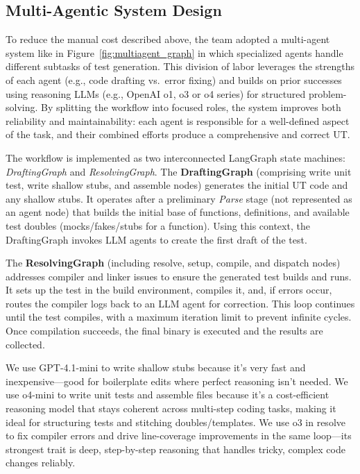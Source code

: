 \documentclass[conference]{IEEEtran}
\begin{document}
\subsection{Multi-Agentic System Design}
To reduce the manual cost described above, the team adopted a multi-agent system like in Figure~\ref{fig:multiagent_graph} in which specialized agents handle different subtasks of test generation. This division of labor leverages the strengths of each agent (e.g., code drafting vs.\ error fixing) and builds on prior successes using reasoning LLMs (e.g., OpenAI o1, o3 or o4 series) for structured problem-solving. By splitting the workflow into focused roles, the system improves both reliability and maintainability: each agent is responsible for a well-defined aspect of the task, and their combined efforts produce a comprehensive and correct UT.

The workflow is implemented as two interconnected LangGraph state machines: \textit{DraftingGraph} and \textit{ResolvingGraph}. The \textbf{DraftingGraph} (comprising write unit test, write shallow stubs, and assemble nodes) generates the initial UT code and any shallow stubs. It operates after a preliminary \textit{Parse} stage (not represented as an agent node) that builds the initial base of functions, definitions, and available test doubles (mocks/fakes/stubs for a function). Using this context, the DraftingGraph invokes LLM agents to create the first draft of the test.

The \textbf{ResolvingGraph} (including resolve, setup, compile, and dispatch nodes) addresses compiler and linker issues to ensure the generated test builds and runs. It sets up the test in the build environment, compiles it, and, if errors occur, routes the compiler logs back to an LLM agent for correction. This loop continues until the test compiles, with a maximum iteration limit to prevent infinite cycles. Once compilation succeeds, the final binary is executed and the results are collected.

We use GPT-4.1-mini to write shallow stubs because it’s very fast and inexpensive—good for boilerplate edits where perfect reasoning isn’t needed. We use o4-mini to write unit tests and assemble files because it’s a cost-efficient reasoning model that stays coherent across multi-step coding tasks, making it ideal for structuring tests and stitching doubles/templates. We use o3 in resolve to fix compiler errors and drive line-coverage improvements in the same loop—its strongest trait is deep, step-by-step reasoning that handles tricky, complex code changes reliably.
\end{document}
